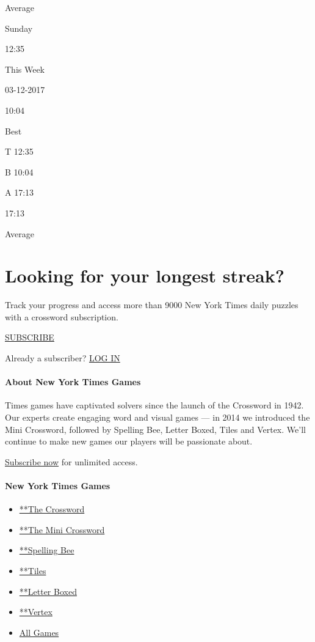 Average

Sunday

12:35

This Week

03-12-2017

10:04

Best

T 12:35

B 10:04

A 17:13

17:13

Average

\hypertarget{looking-for-your-longest-streak}{%
\section{Looking for your longest
streak?}\label{looking-for-your-longest-streak}}

Track your progress and access more than 9000 New York Times daily
puzzles with a crossword subscription.

\href{https://www.nytimes.com/subscription/games?campaignId=4QHQ8}{SUBSCRIBE}

Already a subscriber?
\href{https://myaccount.nytimes.com/auth/login?redirect_uri=https\%3A\%2F\%2Fwww.nytimes.com\%2Fpuzzles\%2Fstats\&response_type=cookie\&client_id=games\&application=crosswords\&asset=stats}{LOG
IN}

\hypertarget{about-new-york-times-games}{%
\paragraph{About New York Times
Games}\label{about-new-york-times-games}}

Times games have captivated solvers since the launch of the Crossword in
1942. Our experts create engaging word and visual games --- in 2014 we
introduced the Mini Crossword, followed by Spelling Bee, Letter Boxed,
Tiles and Vertex. We'll continue to make new games our players will be
passionate about.

\href{https://www.nytimes.com/subscription/games?campaignId=9W9LL}{Subscribe
now} for unlimited access.

\hypertarget{new-york-times-games-1}{%
\paragraph{New York Times Games}\label{new-york-times-games-1}}

\begin{itemize}
\tightlist
\item
  \href{/crosswords/game/daily}{**The Crossword}
\item
  \href{/crosswords/game/mini}{**The Mini Crossword}
\item
  \href{/puzzles/spelling-bee}{**Spelling Bee}
\item
  \href{/puzzles/tiles}{**Tiles}
\item
  \href{/puzzles/letter-boxed}{**Letter Boxed}
\item
  \href{/puzzles/vertex}{**Vertex}
\item
  \href{/crosswords}{All Games}
\end{itemize}

